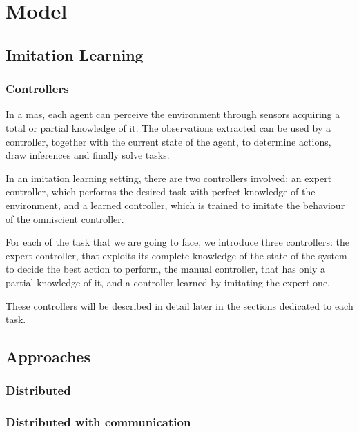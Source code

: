 \chapter{Model}
\label{chap:model}

\section{Imitation Learning}
\label{sec:imitlrng}
\subsection{Controllers}
\label{subsec:controllersmodel}

In a \gls{mas}, each agent can perceive the environment through sensors 
acquiring a total or partial knowledge of it. The observations extracted can be 
used by a controller, together with the current state of the agent, to determine 
actions, draw inferences and finally solve tasks. 

In an imitation learning setting, there are two controllers involved: an expert 
controller, which performs the desired task with perfect knowledge of the 
environment, and a learned controller, which is trained to imitate the behaviour 
of the omniscient controller.

For each of the task that we are going to face, we introduce three controllers: the 
expert controller, that exploits its complete knowledge of the state of the system 
to decide the best action to perform, the manual controller, that has only a partial 
knowledge of it, and a controller learned by imitating the expert one.

These controllers will be described in detail later in the sections dedicated to each 
task.

\section{Approaches}
\label{sec:app}
\subsection{Distributed}
\label{subsec:dist}

\subsection{Distributed with communication}
\label{subsec:comm}